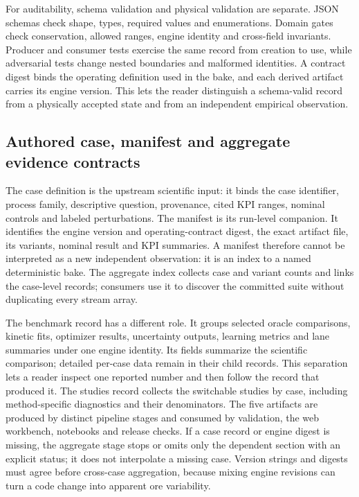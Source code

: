 \documentclass[10pt]{article}
\begin{document}
For auditability, schema validation and physical validation are
separate. JSON schemas check shape, types, required values and
enumerations. Domain gates check conservation, allowed ranges, engine
identity and cross-field invariants. Producer and consumer tests
exercise the same record from creation to use, while adversarial tests
change nested boundaries and malformed identities. A contract digest
binds the operating definition used in the bake, and each derived
artifact carries its engine version. This lets the reader distinguish a
schema-valid record from a physically accepted state and from an
independent empirical observation.

\subsection{Authored case, manifest and aggregate evidence
contracts}\label{authored-case-manifest-and-aggregate-evidence-contracts}

\label{contract-authored}

The case definition is the upstream scientific input: it binds the case
identifier, process family, descriptive question, provenance, cited KPI
ranges, nominal controls and labeled perturbations. The manifest is its
run-level companion. It identifies the engine version and
operating-contract digest, the exact artifact file, its variants,
nominal result and KPI summaries. A manifest therefore cannot be
interpreted as a new independent observation: it is an index to a named
deterministic bake. The aggregate index collects case and variant counts
and links the case-level records; consumers use it to discover the
committed suite without duplicating every stream array.

The benchmark record has a different role. It groups selected oracle
comparisons, kinetic fits, optimizer results, uncertainty outputs,
learning metrics and lane summaries under one engine identity. Its
fields summarize the scientific comparison; detailed per-case data
remain in their child records. This separation lets a reader inspect one
reported number and then follow the record that produced it. The studies
record collects the switchable studies by case, including
method-specific diagnostics and their denominators. The five artifacts
are produced by distinct pipeline stages and consumed by validation, the
web workbench, notebooks and release checks. If a case record or engine
digest is missing, the aggregate stage stops or omits only the dependent
section with an explicit status; it does not interpolate a missing case.
Version strings and digests must agree before cross-case aggregation,
because mixing engine revisions can turn a code change into apparent ore
variability.
\end{document}
